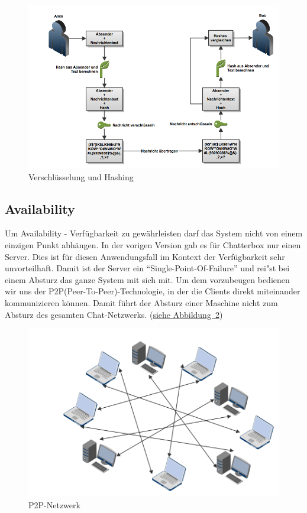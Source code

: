 \documentclass[12pt,a4paper,titlepage,oneside]{scrartcl}
\begin{document}
\begin{figure}[h!]
  \centering
    \includegraphics[width=1.0\textwidth]{./imgs/encryption.png}
  \caption{Verschl\"usselung und Hashing}
  \label{fig:encryption}
\end{figure}

\subsection{Availability}
Um Availability - Verf\"ugbarkeit zu gew\"ahrleisten darf das System nicht von einem einzigen Punkt abh\"angen. In der vorigen Version gab es f\"ur Chatterbox nur einen Server. Dies ist f\"ur diesen Anwendungsfall im Kontext der Verf\"ugbarkeit sehr unvorteilhaft. Damit ist der Server ein ``Single-Point-Of-Failure'' und rei"st bei einem Absturz das ganze System mit sich mit. Um dem vorzubeugen bedienen wir uns der P2P(Peer-To-Peer)-Technologie, in der die Clients direkt miteinander kommunizieren k\"onnen. Damit f\"uhrt der Absturz einer Maschine nicht zum Absturz des gesamten Chat-Netzwerks. (\hyperref[fig:p2p]{siehe Abbildung~\ref*{fig:p2p}})

\begin{figure}[h!]
  \centering
    \includegraphics[width=1.0\textwidth]{./imgs/p2p.png}
  \caption{P2P-Netzwerk}
  \label{fig:p2p}
\end{figure}
\end{document}
